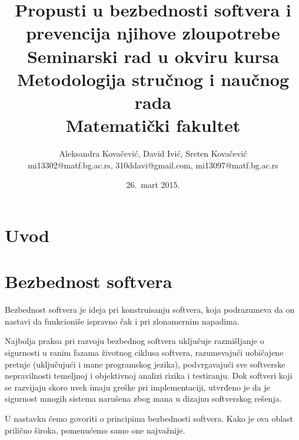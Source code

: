 \documentclass[a4paper]{article}
\begin{document}
\title{Propusti u bezbednosti softvera i prevencija njihove zloupotrebe\\ \small{Seminarski rad u okviru kursa\\Metodologija stručnog i naučnog rada\\ Matematički fakultet}}

\author{Aleksandra Kovačević, David Ivić, Sreten Kovačević\\ mi13302@matf.bg.ac.rs, 310ddavi@gmail.com, mi13097@matf.bg.ac.rs}
\date{26.~mart 2015.}

\maketitle


\tableofcontents

\newpage

\section{Uvod}



\section{Bezbednost softvera}

Bezbednost softvera je ideja pri konstruisanju softvera, koja podrazumeva da on nastavi da funkcioniše ispravno čak i pri zlonamernim napadima.

Najbolja praksa pri razvoju bezbednog softvera uključuje razmišljanje o sigurnosti u ranim fazama životnog ciklusa softvera, razumevajući uobičajene pretnje (uključujući i mane programskog jezika), podvrgavajući sve softverske nepravilnosti temeljnoj i objektivnoj analizi rizika i testiranju. Dok softveri koji se razvijaju skoro uvek imaju greške pri implementaciji, utvrđeno je da je sigurnost mnogih sistema narušena zbog mana u dizajnu softverskog rešenja.

U nastavku ćemo govoriti o principima bezbednosti softvera. Kako je ova oblast prilično široka, pomenućemo samo one najvažnije.
\end{document}
